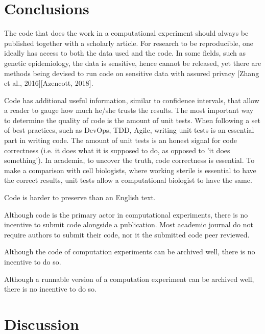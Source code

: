 \section{Conclusions}

The code that does the work in a computational experiment should
always be published together with a scholarly article.
For research to be reproducible, one ideally has access to
both the data used and the code.
In some fields, such as genetic epidemiology, the data is
sensitive, hence cannot be released,
yet there are methods being devised to run code on sensitive
data with assured privacy [Zhang et al., 2016][Azencott, 2018].

Code has additional useful information, similar to confidence intervals,
that allow a reader to gauge how much he/she trusts the results.
The most important way to determine the quality of code
is the amount of unit tests.
When following a set of best practices, such as DevOps, TDD, Agile,
writing unit tests is an essential 
part in writing code.
The amount of unit tests is an honest signal 
for code correctness (i.e. it does what it is supposed to do, as opposed
to 'it does something').
In academia, to uncover the truth, code correctness is essential.
To make a comparison with cell biologists, where working
sterile is essential to have the correct results,
unit tests allow a computational biologist to have the same.

Code is harder to preserve than an English text.

Although code is the primary actor in computational experiments,
there is no incentive to submit code alongside a publication.
Most academic journal do not require authors to submit their code,
nor it the submitted code peer reviewed.

Although the code of computation experiments can be archived well, 
there is no incentive to do so.

Although a runnable version of a computation experiment can be archived well, 
there is no incentive to do so.

\section{Discussion}

